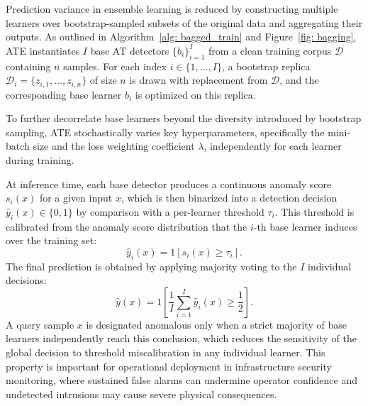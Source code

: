 \documentclass[pdflatex,sn-mathphys-num]{sn-jnl}
\theoremstyle{thmstyleone}
\theoremstyle{thmstyletwo}
\theoremstyle{thmstylethree}
\begin{document}
Prediction variance in ensemble learning is reduced by constructing multiple learners over bootstrap-sampled subsets of the original data and aggregating their outputs. As outlined in Algorithm~\ref{alg: bagged_train} and Figure~\ref{fig: bagging}, ATE instantiates $I$ base AT detectors $\{b_i\}_{i=1}^{I}$ from a clean training corpus $\mathcal{D}$ containing $n$ samples. For each index $i\in\{1,\dots,I\}$, a bootstrap replica $\mathcal{D}_i = \{z_{i,1},\dots,z_{i,n}\}$ of size $n$ is drawn with replacement from $\mathcal{D}$, and the corresponding base learner $b_i$ is optimized on this replica.

To further decorrelate base learners beyond the diversity introduced by bootstrap sampling, ATE stochastically varies key hyperparameters, specifically the mini-batch size and the loss weighting coefficient $\lambda$, independently for each learner during training.

At inference time, each base detector produces a continuous anomaly score $s_i(x)$ for a given input $x$, which is then binarized into a detection decision $\hat{y}_i(x) \in \{0, 1\}$ by comparison with a per-learner threshold $\tau_i$. This threshold is calibrated from the anomaly score distribution that the $i$-th base learner induces over the training set:
\begin{equation}
    \hat{y}_i(x) = \mathrm{1}\left[s_i(x) \geq \tau_i\right].
\end{equation}
The final prediction is obtained by applying majority voting to the $I$ individual decisions:
\begin{equation}
    \hat{y}(x) = \mathrm{1}\!\left[\frac{1}{I}\sum_{i=1}^{I}\hat{y}_i(x) \geq \frac{1}{2} \right].
\end{equation}
A query sample $x$ is designated anomalous only when a strict majority of base learners independently reach this conclusion, which reduces the sensitivity of the global decision to threshold miscalibration in any individual learner. This property is important for operational deployment in infrastructure security monitoring, where sustained false alarms can undermine operator confidence and undetected intrusions may cause severe physical consequences.

\begin{algorithm}[t]
    \caption{ATE Training}\label{alg: bagged_train}
    \DontPrintSemicolon
    
\end{algorithm}
\end{document}

